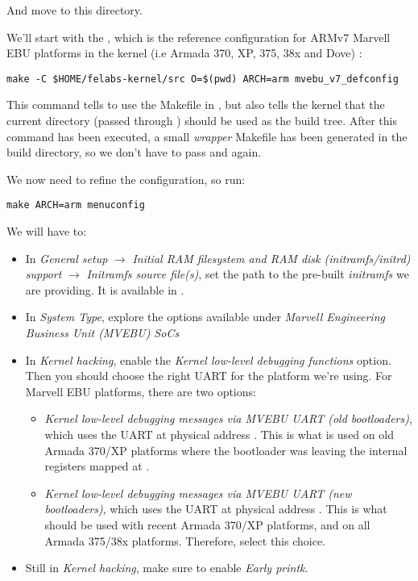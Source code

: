 And move to this directory.

We'll start with the , which is the reference
configuration for ARMv7 Marvell EBU platforms in the kernel (i.e
Armada 370, XP, 375, 38x and Dove) :

\begin{verbatim}
make -C $HOME/felabs-kernel/src O=$(pwd) ARCH=arm mvebu_v7_defconfig
\end{verbatim}

This command tells  to use the Makefile in
, but also tells the kernel that the
current directory (passed through ) should be used as the
build tree. After this command has been executed, a small {\em
  wrapper} Makefile has been generated in the build directory, so we
don't have to pass  and  again.

We now need to refine the configuration, so run:

\begin{verbatim}
make ARCH=arm menuconfig
\end{verbatim}

We will have to:

\begin{itemize}
\item In {\em General setup} $\rightarrow$ {\em Initial RAM filesystem
    and RAM disk (initramfs/initrd) support} $\rightarrow$ {\em
    Initramfs source file(s)}, set the path to the pre-built {\em
    initramfs} we are providing. It is available in
  .
\item In {\em System Type}, explore the options available under {\em
    Marvell Engineering Business Unit (MVEBU) SoCs}
\item In {\em Kernel hacking}, enable the {\em Kernel low-level
    debugging functions} option. Then you should choose the right UART
  for the platform we're using. For Marvell EBU platforms, there are
  two options:
  \begin{itemize}
  \item {\em Kernel low-level debugging messages via MVEBU UART (old
      bootloaders)}, which uses the UART at physical address
    . This is what is used on old Armada 370/XP
    platforms where the bootloader was leaving the internal registers
    mapped at .
  \item {\em Kernel low-level debugging messages via MVEBU UART (new
      bootloaders)}, which uses the UART at physical address
    . This is what should be used with recent Armada
    370/XP platforms, and on all Armada 375/38x platforms. Therefore,
    select this choice.
  \end{itemize}
\item Still in {\em Kernel hacking}, make sure to enable {\em Early
    printk}.
\end{itemize}

